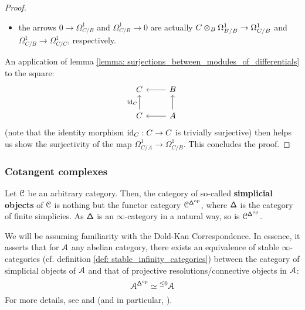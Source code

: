 \begin{proof}
\begin{itemize}
                                \item the arrows $0 \to \Omega^1_{C/B}$ and $\Omega^1_{C/B} \to 0$ are actually $C \tensor_B \Omega^1_{B/B} \to \Omega^1_{C/B}$ and $\Omega^1_{C/B} \to \Omega^1_{C/C}$, respectively.
                            \end{itemize}
                        An application of lemma \ref{lemma: surjections_between_modules_of_differentials} to the square:
                            $$
                                \begin{tikzcd}
                                	C & B \\
                                	C & A
                                	\arrow["{\id_C}", from=2-1, to=1-1]
                                	\arrow[from=2-2, to=1-2]
                                	\arrow[from=1-2, to=1-1]
                                	\arrow[from=2-2, to=2-1]
                                \end{tikzcd}
                            $$
                        (note that the identity morphism $\mathrm{id}_C: C \to C$ is trivially surjective) then helps us show the surjectivity of the map $\Omega^1_{C/A} \to \Omega^1_{C/B}$. This concludes the proof.
                    \end{proof}
                    
            \subsubsection{Cotangent complexes}
                \begin{convention}
                    Let $\mathcal{C}$ be an arbitrary category. Then, the category of so-called \textbf{simplicial objects} of $\mathcal{C}$ is nothing but the functor category $\mathcal{C}^{\mathsf{\Delta}^{\mathrm{op}}}$, where $\mathsf{\Delta}$ is the category of finite simplicies. As $\mathsf{\Delta}$ is an $\infty$-category in a natural way, so is $\mathcal{C}^{\mathsf{\Delta}^{\mathrm{op}}}$.
                \end{convention}
                
                \begin{remark} \label{remark: the_dold_kan_correspondence}
                    We will be assuming familiarity with the Dold-Kan Correspondence. In essence, it asserts that for $\mathcal{A}$ any abelian category, there exists an equivalence of stable $\infty$-categories (cf. definition \ref{def: stable_infinity_categories}) between the category of simplicial objects of $\mathcal{A}$ and that of projective resolutions/connective objects in $\mathcal{A}$:
                        $$\mathcal{A}^{\mathsf{\Delta}^{\mathrm{op}}} \simeq {}^{\leq 0}\mathcal{A}$$
                    For more details, see \cite{nlab:dold-kan_correspondence} and \cite[Subsection 1.2.3]{HA} (and in particular, \cite[Theorem 1.2.3.7]{HA}).
                \end{remark}
                
